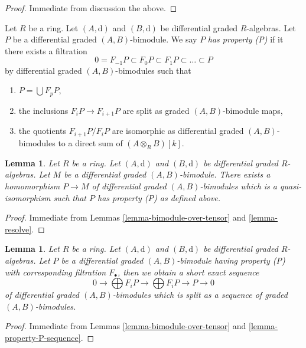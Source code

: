 \documentclass{stacks-project}
\theoremstyle{plain}
\newtheorem{lemma}[subsection]{Lemma}
\theoremstyle{definition}
\theoremstyle{remark}
\numberwithin{equation}{subsection}
\begin{document}
\begin{proof}
Immediate from discussion the above.
\end{proof}

\noindent
Let $R$ be a ring. Let $(A, \text{d})$ and $(B, \text{d})$ be
differential graded $R$-algebras.
Let $P$ be a differential graded $(A, B)$-bimodule. We say $P$
{\it has property (P)} if it there exists a filtration
$$
0 = F_{-1}P \subset F_0P \subset F_1P \subset \ldots \subset P
$$
by differential graded $(A, B)$-bimodules such that
\begin{enumerate}
\item $P = \bigcup F_pP$,
\item the inclusions $F_iP \to F_{i + 1}P$ are split as graded
$(A, B)$-bimodule maps,
\item the quotients $F_{i + 1}P/F_iP$ are isomorphic as differential
graded $(A, B)$-bimodules to a direct sum of $(A \otimes_R B)[k]$.
\end{enumerate}

\begin{lemma}
\label{lemma-bimodule-resolve}
Let $R$ be a ring. Let $(A, \text{d})$ and $(B, \text{d})$ be
differential graded $R$-algebras. Let $M$ be a differential graded
$(A, B)$-bimodule. There exists a homomorphism $P \to M$
of differential graded $(A, B)$-bimodules which is a quasi-isomorphism
such that $P$ has property (P) as defined above.
\end{lemma}

\begin{proof}
Immediate from Lemmas \ref{lemma-bimodule-over-tensor} and
\ref{lemma-resolve}.
\end{proof}

\begin{lemma}
\label{lemma-bimodule-property-P-sequence}
Let $R$ be a ring. Let $(A, \text{d})$ and $(B, \text{d})$ be
differential graded $R$-algebras. Let $P$ be a
differential graded $(A, B)$-bimodule having property (P)
with corresponding filtration $F_\bullet$, then we obtain a
short exact sequence
$$
0 \to
\bigoplus\nolimits F_iP \to
\bigoplus\nolimits F_iP \to P \to 0
$$
of differential graded $(A, B)$-bimodules which is split as a sequence
of graded $(A, B)$-bimodules.
\end{lemma}

\begin{proof}
Immediate from Lemmas \ref{lemma-bimodule-over-tensor} and
\ref{lemma-property-P-sequence}.
\end{proof}
\end{document}
